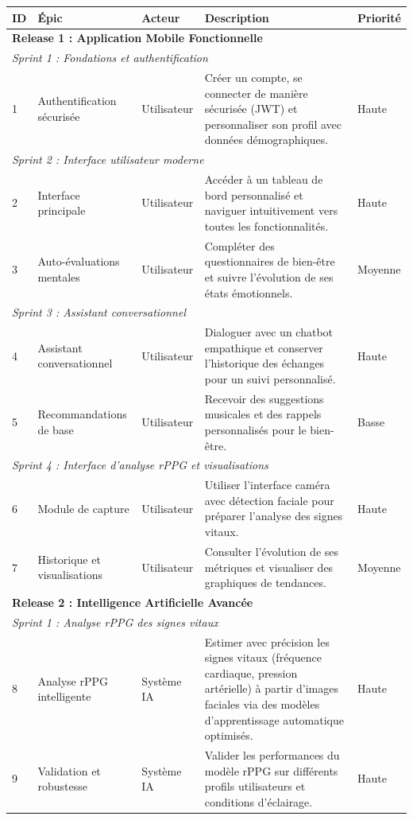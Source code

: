 \begin{table}[H]\centering
\small
\renewcommand{\arraystretch}{1.12}
\begin{tabularx}{\linewidth}{|p{0.8cm}|p{3.2cm}|p{2.3cm}|X|p{1.6cm}|}
\hline
\textbf{ID} & \textbf{Épic} & \textbf{Acteur} & \textbf{Description} & \textbf{Priorité} \\
\hline
\multicolumn{5}{|l|}{\textbf{Release 1 : Application Mobile Fonctionnelle}}\\
\hline
\multicolumn{5}{|l|}{\textit{Sprint 1 : Fondations et authentification}}\\
\hline
1 & Authentification sécurisée & Utilisateur & Créer un compte, se connecter de manière sécurisée (JWT) et personnaliser son profil avec données démographiques. & Haute \\
\hline
\multicolumn{5}{|l|}{\textit{Sprint 2 : Interface utilisateur moderne}}\\
\hline
2 & Interface principale & Utilisateur & Accéder à un tableau de bord personnalisé et naviguer intuitivement vers toutes les fonctionnalités. & Haute \\
\hline
3 & Auto-évaluations mentales & Utilisateur & Compléter des questionnaires de bien-être et suivre l'évolution de ses états émotionnels. & Moyenne \\
\hline
\multicolumn{5}{|l|}{\textit{Sprint 3 : Assistant conversationnel}}\\
\hline
4 & Assistant conversationnel & Utilisateur & Dialoguer avec un chatbot empathique et conserver l'historique des échanges pour un suivi personnalisé. & Haute \\
\hline
5 & Recommandations de base & Utilisateur & Recevoir des suggestions musicales et des rappels personnalisés pour le bien-être. & Basse \\
\hline
\multicolumn{5}{|l|}{\textit{Sprint 4 : Interface d'analyse rPPG et visualisations}}\\
\hline
6 & Module de capture & Utilisateur & Utiliser l'interface caméra avec détection faciale pour préparer l'analyse des signes vitaux. & Haute \\
\hline
7 & Historique et visualisations & Utilisateur & Consulter l'évolution de ses métriques et visualiser des graphiques de tendances. & Moyenne \\
\hline
\multicolumn{5}{|l|}{\textbf{Release 2 : Intelligence Artificielle Avancée}}\\
\hline
\multicolumn{5}{|l|}{\textit{Sprint 1 : Analyse rPPG des signes vitaux}}\\
\hline
8 & Analyse rPPG intelligente & Système IA & Estimer avec précision les signes vitaux (fréquence cardiaque, pression artérielle) à partir d'images faciales via des modèles d'apprentissage automatique optimisés. & Haute \\
\hline
9 & Validation et robustesse & Système IA & Valider les performances du modèle rPPG sur différents profils utilisateurs et conditions d'éclairage. & Haute \\
\hline
\end{tabularx}
\end{table}


